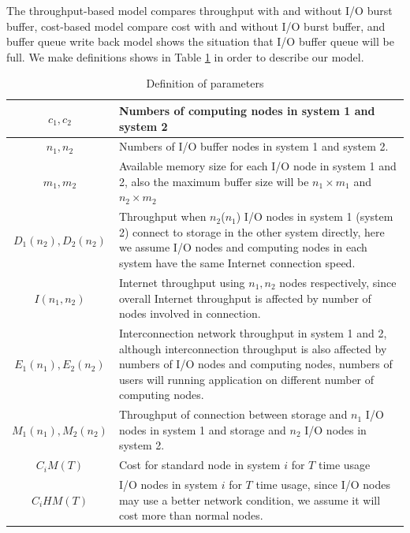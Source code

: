 The throughput-based model compares throughput with and without I/O burst buffer, cost-based model compare cost with and without I/O burst buffer, and buffer queue write back model shows the situation that I/O buffer queue will be full.
We make definitions shows in Table \ref{definition} in order to describe our model.
\begin{table}[tb]
	\caption{Definition of parameters}
	\label{definition}
\begin{tabular}{|c|p{5cm}|}
	\hline
	$c_1,c_2$&Numbers of computing nodes in system 1 and system 2\\\hline
	$n_1, n_2$&Numbers of I/O buffer nodes in system 1 and system 2.\\\hline
	$m_1,m_2$&Available memory size for each I/O node in system 1 and 2, also the maximum buffer size will be $n_1\times m_1$ and $n_2\times m_2$\\\hline
	$D_1(n_2),D_2(n_2)$&Throughput when $n_2$($n_1$) I/O nodes in system 1 (system 2) connect to storage in the other system directly, here we assume I/O nodes and computing nodes in each system have the same Internet connection speed.\\\hline%
	$I(n_1,n_2)$& 	Internet throughput using $n_1,n_2$ nodes respectively, since overall Internet throughput is affected by number of nodes involved in connection.\\\hline
	$E_1(n_1), E_2(n_2)$&Interconnection network throughput in system 1 and 2, although interconnection throughput is also affected by numbers of I/O nodes and computing nodes, numbers of users will running application on different number of computing nodes.\\\hline
	$M_1(n_1),M_2(n_2)$& Throughput of connection between storage and $n_1$ I/O nodes in system 1 and storage and $n_2$ I/O nodes in system 2.\\\hline
	$C_iM(T)$& Cost for standard node in system $i$ for $T$ time usage\\\hline
	$C_iHM(T)$ &I/O nodes in system $i$ for $T$ time usage, since I/O nodes may use a better network condition, we assume it will cost more than normal nodes.\\\hline
\end{tabular}
\end{table}

